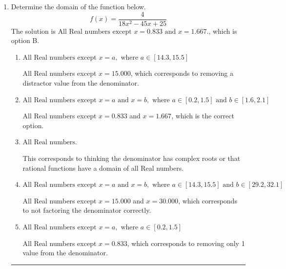 \documentclass{extbook}[14pt]
\newcommand{\litem}[1]{\item #1

\rule{\textwidth}{0.4pt}}
\begin{document}
\begin{enumerate}\litem{
Determine the domain of the function below.
\[ f(x) = \frac{4}{18x^{2} -45 x + 25} \]The solution is \( \text{All Real numbers except } x = 0.833 \text{ and } x = 1.667. \), which is option B.\begin{enumerate}[label=\Alph*.]
\item \( \text{All Real numbers except } x = a, \text{ where } a \in [14.3, 15.5] \)

All Real numbers except $x = 15.000$, which corresponds to removing a distractor value from the denominator.
\item \( \text{All Real numbers except } x = a \text{ and } x = b, \text{ where } a \in [0.2, 1.5] \text{ and } b \in [1.6, 2.1] \)

All Real numbers except $x = 0.833$ and $x = 1.667$, which is the correct option.
\item \( \text{All Real numbers.} \)

This corresponds to thinking the denominator has complex roots or that rational functions have a domain of all Real numbers.
\item \( \text{All Real numbers except } x = a \text{ and } x = b, \text{ where } a \in [14.3, 15.5] \text{ and } b \in [29.2, 32.1] \)

All Real numbers except $x = 15.000$ and $x = 30.000$, which corresponds to not factoring the denominator correctly.
\item \( \text{All Real numbers except } x = a, \text{ where } a \in [0.2, 1.5] \)

All Real numbers except $x = 0.833$, which corresponds to removing only 1 value from the denominator.
\end{enumerate}

}
\end{enumerate}
\end{document}
